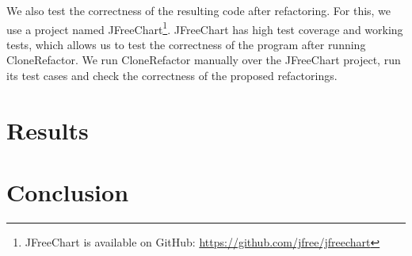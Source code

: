 \documentclass[runningheads]{llncs}
\begin{document}
We also test the correctness of the resulting code after refactoring. For this, we use a project named JFreeChart\footnote{JFreeChart is available on GitHub: \url{https://github.com/jfree/jfreechart}}. JFreeChart has high test coverage and working tests, which allows us to test the correctness of the program after running CloneRefactor. We run CloneRefactor manually over the JFreeChart project, run its test cases and check the correctness of the proposed refactorings.

\section{Results}

\section{Conclusion}




\end{document}
